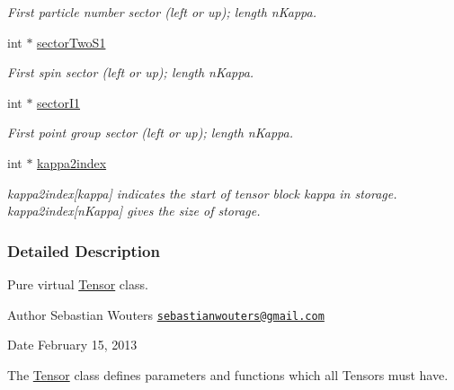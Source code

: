 \begin{DoxyCompactItemize}
\begin{DoxyCompactList}\small\item\em First particle number sector (left or up); length n\-Kappa. \end{DoxyCompactList}\item 
\hypertarget{classCheMPS2_1_1Tensor_aeddc738e8c4c4cf74f34cafb1cc5e572}{int $\ast$ \hyperlink{classCheMPS2_1_1Tensor_aeddc738e8c4c4cf74f34cafb1cc5e572}{sector\-Two\-S1}}\label{classCheMPS2_1_1Tensor_aeddc738e8c4c4cf74f34cafb1cc5e572}

\begin{DoxyCompactList}\small\item\em First spin sector (left or up); length n\-Kappa. \end{DoxyCompactList}\item 
\hypertarget{classCheMPS2_1_1Tensor_abef0c01a91878bf9b821fc2cd8a57875}{int $\ast$ \hyperlink{classCheMPS2_1_1Tensor_abef0c01a91878bf9b821fc2cd8a57875}{sector\-I1}}\label{classCheMPS2_1_1Tensor_abef0c01a91878bf9b821fc2cd8a57875}

\begin{DoxyCompactList}\small\item\em First point group sector (left or up); length n\-Kappa. \end{DoxyCompactList}\item 
\hypertarget{classCheMPS2_1_1Tensor_ab0c53b7a9fd798d2160d611f83c48133}{int $\ast$ \hyperlink{classCheMPS2_1_1Tensor_ab0c53b7a9fd798d2160d611f83c48133}{kappa2index}}\label{classCheMPS2_1_1Tensor_ab0c53b7a9fd798d2160d611f83c48133}

\begin{DoxyCompactList}\small\item\em kappa2index\mbox{[}kappa\mbox{]} indicates the start of tensor block kappa in storage. kappa2index\mbox{[}n\-Kappa\mbox{]} gives the size of storage. \end{DoxyCompactList}\end{DoxyCompactItemize}


\subsubsection{Detailed Description}
Pure virtual \hyperlink{classCheMPS2_1_1Tensor}{Tensor} class. \begin{DoxyAuthor}{Author}
Sebastian Wouters \href{mailto:sebastianwouters@gmail.com}{\tt sebastianwouters@gmail.\-com} 
\end{DoxyAuthor}
\begin{DoxyDate}{Date}
February 15, 2013
\end{DoxyDate}
The \hyperlink{classCheMPS2_1_1Tensor}{Tensor} class defines parameters and functions which all Tensors must have. 

